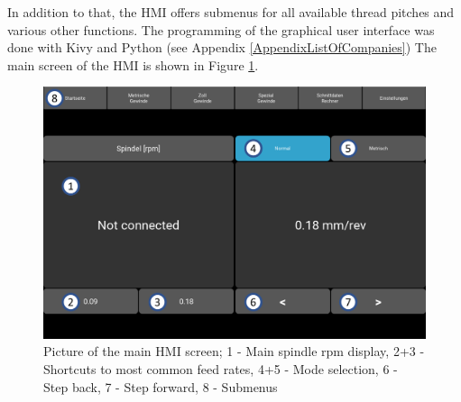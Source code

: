 In addition to that, the HMI offers submenus for all available thread pitches and various other functions. The programming of the graphical user interface was done with Kivy and Python (see Appendix \ref{AppendixListOfCompanies}) The main screen of the HMI is shown in Figure \ref{HMI main Screen}.
 
\begin{figure}
    \begin{center}
    \includegraphics[width=12cm]{Pictures/HMI.png}
    \caption[Picture of the main HMI screen]{Picture of the main HMI screen; 1 - Main spindle rpm display, 2+3 - Shortcuts to most common feed rates, 4+5 - Mode selection, 6 - Step back, 7 - Step forward, 8 - Submenus}
    \label{HMI main Screen}
    \end{center}
\end{figure}
 
